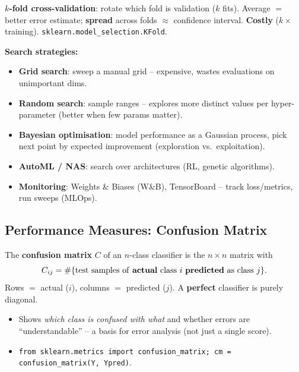 \documentclass[10pt,a4paper]{article}
\begin{document}
	\begin{definitionbox}
		\textbf{$k$-fold cross-validation}: rotate which fold is validation ($k$ fits). Average $=$ better error estimate; \textbf{spread} across folds $\approx$ confidence interval. \textbf{Costly} ($k\times$ training). \texttt{sklearn.model\_selection.KFold}.
	\end{definitionbox}

	\textbf{Search strategies:}
	\begin{itemize}[leftmargin=*]
		\item \textbf{Grid search}: sweep a manual grid -- expensive, wastes evaluations on unimportant dims.
		\item \textbf{Random search}: sample ranges -- explores more distinct values per hyper-parameter (better when few params matter).
		\item \textbf{Bayesian optimisation}: model performance as a Gaussian process, pick next point by expected improvement (exploration vs.\ exploitation).
		\item \textbf{AutoML / NAS}: search over architectures (RL, genetic algorithms).
		\item \textbf{Monitoring}: Weights \& Biases (W\&B), TensorBoard -- track loss/metrics, run sweeps (MLOps).
	\end{itemize}

	\subsection{Performance Measures: Confusion Matrix}

	\begin{definitionbox}
		The \textbf{confusion matrix} $C$ of an $n$-class classifier is the $n\times n$ matrix with
		\[
		C_{ij} = \#\{\text{test samples of \textbf{actual} class } i \text{ \textbf{predicted} as class } j\}.
		\]
		Rows $=$ actual ($i$), columns $=$ predicted ($j$). A \textbf{perfect} classifier is purely diagonal.
	\end{definitionbox}

	\begin{itemize}[leftmargin=*]
		\item Shows \emph{which class is confused with what} and whether errors are ``understandable'' -- a basis for error analysis (not just a single score).
		\item \texttt{from sklearn.metrics import confusion\_matrix; cm = confusion\_matrix(Y, Ypred)}.
	\end{itemize}
\end{document}
